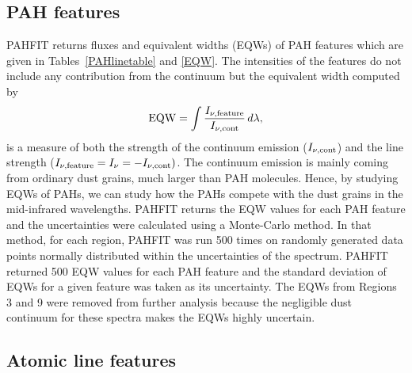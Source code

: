 \subsection{PAH features}
\label{sect:pah}

PAHFIT returns fluxes and equivalent widths (EQWs) of PAH features which are given in Tables~\ref{PAHlinetable} and \ref{EQW}. The intensities of the features do not include any contribution from the continuum but the equivalent width computed by
\begin{equation}
{\rm EQW}=\int \frac{I_{\nu,{\rm feature}}}{I_{\nu, {\rm cont}}} \,d\lambda,
\end{equation}
is a measure of both the strength of the continuum emission ($I_{\nu, {\rm cont}} $) and the line strength 
($I_{\nu,{\rm feature}}=I_{\nu} =- I_{\nu, {\rm cont}})$. 
The continuum emission is mainly coming from ordinary dust grains, much larger than PAH molecules. Hence, by studying EQWs of PAHs, 
we can study how the PAHs compete with the dust grains in the mid-infrared wavelengths.  PAHFIT returns the EQW values for each PAH 
feature and the uncertainties were calculated using a Monte-Carlo method. In that method, for each region, PAHFIT was run 500 times on 
randomly generated data points  normally distributed within the uncertainties of the spectrum. PAHFIT returned 500 EQW values for each 
PAH feature and the standard deviation of EQWs for a given feature was taken as its uncertainty. 
The EQWs from Regions 3 and 9 were removed from further analysis because the negligible dust continuum for these spectra makes
the EQWs highly uncertain.


\subsection{Atomic line features}
\label{sect:atomic}

